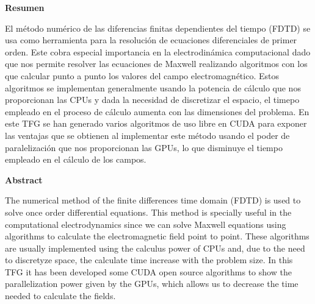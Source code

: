 \documentclass[11pt,a4paper,twoside,pdf]{article}
\numberwithin{equation}{section}
\begin{document}
\begin{center}

{\bf Resumen}
\bigskip

\begin{minipage}{0.8\linewidth}
El método numérico de las diferencias finitas dependientes del tiempo (FDTD) se usa como herramienta para la resolución de ecuaciones diferenciales de primer orden.  Este cobra especial importancia en la electrodinámica computacional dado que nos permite resolver las ecuaciones de Maxwell realizando algoritmos con los que calcular punto a punto los valores del campo electromagnético. Estos algoritmos se implementan generalmente usando la potencia de cálculo que nos proporcionan las CPUs y dada la necesidad de discretizar el espacio, el timepo empleado en el proceso de cálculo aumenta con las dimensiones del problema. En este TFG se han generado varios algoritmos de uso libre en CUDA para exponer las ventajas que se obtienen al implementar este método usando el poder de paralelización que nos proporcionan las GPUs, lo que disminuye el tiempo empleado en el cálculo de los campos. 
\end{minipage}

\vfill

{\bf Abstract} 
\bigskip

\begin{minipage}{0.8\linewidth}
The numerical method of the finite differences time domain (FDTD) is used to solve once order differential equations. This method is specially useful in the computational electrodynamics since we can solve Maxwell equations using algorithms to calculate the electromagnetic field point to point. These algorithms are usually implemented using the calculus power of CPUs and, due to the need to discretyze space, the calculate time increase with the problem size. In this TFG it has been developed some CUDA open source algorithms to show the parallelization power given by the GPUs, which allows us to decrease the time needed to calculate the fields.
\end{minipage}

\vfill

\end{center}

\newpage

\tableofcontents

\newpage
\end{document}
